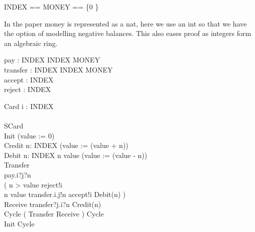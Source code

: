 
\begin{circus}
INDEX == \nat %
\also MONEY == \{0 \} %
\end{circus}
In the paper money is represented as a nat, here we use an int so that we
have the option of modelling negative balances. This also eases proof as
integers form an algebraic ring.

\begin{circus}
\circchannel pay : INDEX \cross INDEX \cross MONEY\\ %
\circchannel transfer : INDEX \cross INDEX \cross MONEY\\ %
\circchannel accept : INDEX\\ %
\circchannel reject : INDEX %
\end{circus}
\begin{circus}

\circprocess Card \circdef  i : INDEX \circspot\\
\circbegin\\
\circstate SCard \\
Init \circdef (value := 0)\\
Credit \circdef  n: INDEX \circspot(value := (value + n))\\
Debit \circdef n: INDEX \circspot \lcircguard n \leq value \rcircguard \circguard (value := (value - n))\\
Transfer \circdef\\
  pay.i?j?n \then\\
    ( \lcircguard n > value \rcircguard \circguard reject!i \then \Skip\\
    \extchoice \lcircguard n \leq value \rcircguard \circguard transfer.i.j!n \then accept!i \then Debit(n) )\\
Receive \circdef transfer?j.i?n \then Credit(n)\\
Cycle \circdef ( Transfer \extchoice Receive ) \circseq Cycle\\
\circspot Init \circseq Cycle\\
\circend
\end{circus}
